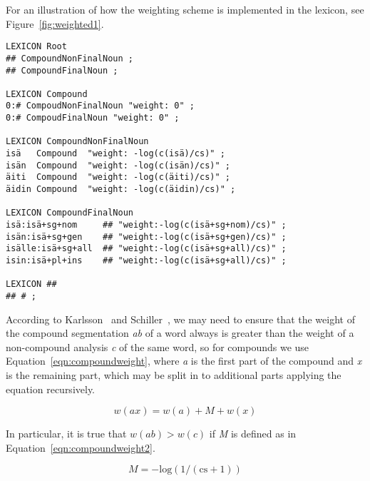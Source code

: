 \documentclass[11pt]{article}
\begin{document}
For an illustration of how the weighting scheme is implemented in the
lexicon, see Figure~\ref{fig:weighted1}.

\begin{figure*}[htb!]
\begin{small}
\begin{verbatim}
LEXICON Root
## CompoundNonFinalNoun ;
## CompoundFinalNoun ;

LEXICON Compound
0:# CompoudNonFinalNoun "weight: 0" ;
0:# CompoudFinalNoun "weight: 0" ;

LEXICON CompoundNonFinalNoun
isä   Compound  "weight: -log(c(isä)/cs)" ;
isän  Compound  "weight: -log(c(isän)/cs)" ;
äiti  Compound  "weight: -log(c(äiti)/cs)" ;
äidin Compound  "weight: -log(c(äidin)/cs)" ;

LEXICON CompoundFinalNoun
isä:isä+sg+nom     ## "weight:-log(c(isä+sg+nom)/cs)" ;
isän:isä+sg+gen    ## "weight:-log(c(isä+sg+gen)/cs)" ;
isälle:isä+sg+all  ## "weight:-log(c(isä+sg+all)/cs)" ;
isin:isä+pl+ins    ## "weight:-log(c(isä+sg+all)/cs)" ;

LEXICON ##
## # ;
\end{verbatim}
\caption{Structure weighting scheme using token penalties.
}\label{fig:weighted1}
\end{small}
\end{figure*}

According to Karlsson~ and
Schiller~, we may need to ensure that the
weight of the compound segmentation \emph{ab} of a word always is
greater than the weight of a non-compound analysis \emph{c} of the
same word, so for compounds we use Equation~\ref{eqn:compoundweight},
where \emph{a} is the first part of the compound and \emph{x} is the
remaining part, which may be split in to additional parts applying the
equation recursively.

\begin{small}
  \begin{equation}
    \label{eqn:compoundweight}
    w(ax) = w(a) + M + w(x)
  \end{equation}
\end{small}

In particular, it is true that $w(ab) > w(c)$ if \emph{M} is
defined as in Equation~\ref{eqn:compoundweight2}.

\begin{small}
  \begin{equation}
    \label{eqn:compoundweight2}
    M = -\mathrm{log}(1/(\mathrm{cs}+1))
  \end{equation}
\end{small}
\end{document}
